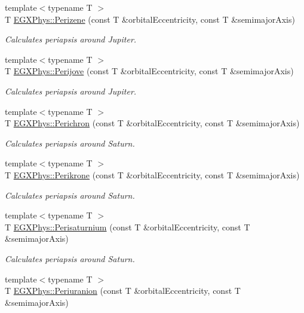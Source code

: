 \begin{DoxyCompactItemize}
{\footnotesize template$<$typename T $>$ }\\T \hyperlink{group___periapsis_ga0523c65b7fc26e675388b2c3d38aa00b}{E\+G\+X\+Phys\+::\+Perizene} (const T \&orbital\+Eccentricity, const T \&semimajor\+Axis)
\begin{DoxyCompactList}\small\item\em Calculates periapsis around Jupiter. \end{DoxyCompactList}\item 
{\footnotesize template$<$typename T $>$ }\\T \hyperlink{group___periapsis_ga075052f7ff9aa1d5fdf4501b493be86b}{E\+G\+X\+Phys\+::\+Perijove} (const T \&orbital\+Eccentricity, const T \&semimajor\+Axis)
\begin{DoxyCompactList}\small\item\em Calculates periapsis around Jupiter. \end{DoxyCompactList}\item 
{\footnotesize template$<$typename T $>$ }\\T \hyperlink{group___periapsis_ga12b5e99aa2e3e7031ef6ce93060cf516}{E\+G\+X\+Phys\+::\+Perichron} (const T \&orbital\+Eccentricity, const T \&semimajor\+Axis)
\begin{DoxyCompactList}\small\item\em Calculates periapsis around Saturn. \end{DoxyCompactList}\item 
{\footnotesize template$<$typename T $>$ }\\T \hyperlink{group___periapsis_gaa56f74c44a3583b8f0d13b821c1d7422}{E\+G\+X\+Phys\+::\+Perikrone} (const T \&orbital\+Eccentricity, const T \&semimajor\+Axis)
\begin{DoxyCompactList}\small\item\em Calculates periapsis around Saturn. \end{DoxyCompactList}\item 
{\footnotesize template$<$typename T $>$ }\\T \hyperlink{group___periapsis_ga60a50d09d29ebe47cbbfc125c2ea42bf}{E\+G\+X\+Phys\+::\+Perisaturnium} (const T \&orbital\+Eccentricity, const T \&semimajor\+Axis)
\begin{DoxyCompactList}\small\item\em Calculates periapsis around Saturn. \end{DoxyCompactList}\item 
{\footnotesize template$<$typename T $>$ }\\T \hyperlink{group___periapsis_gab8b8131a617dd2d2a4de1d48accd7442}{E\+G\+X\+Phys\+::\+Periuranion} (const T \&orbital\+Eccentricity, const T \&semimajor\+Axis)

\end{DoxyCompactItemize}
